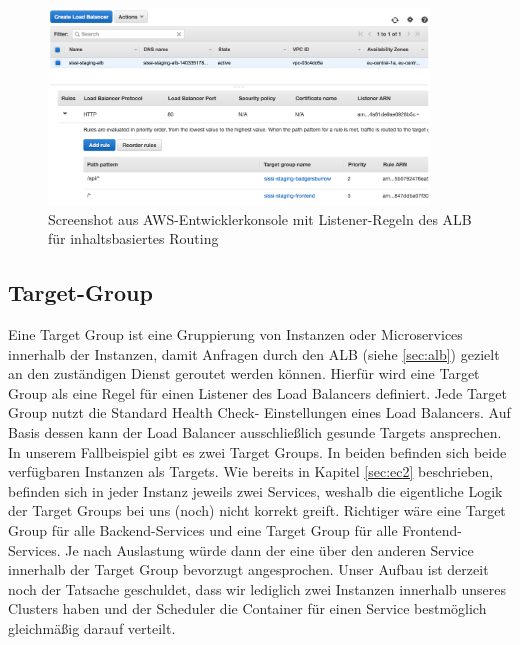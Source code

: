 \begin{figure}[!ht]
  \centering
  \includegraphics[width=0.9\textwidth]{images/routing.png}
  \caption{Screenshot aus AWS-Entwicklerkonsole mit Listener-Regeln des ALB für inhaltsbasiertes Routing}
\end{figure}

\subsection{Target-Group}
\label{sec:target-group}
Eine Target Group ist eine Gruppierung von Instanzen oder Microservices innerhalb der Instanzen, damit Anfragen durch den ALB (siehe \ref{sec:alb}) gezielt an den zuständigen Dienst geroutet werden können. Hierfür wird eine Target Group als eine Regel für einen Listener des Load Balancers definiert. Jede Target Group nutzt die Standard Health Check- Einstellungen eines Load Balancers. Auf Basis dessen kann der Load Balancer ausschließlich gesunde Targets ansprechen. \cite{aws:target} \\

In unserem Fallbeispiel gibt es zwei Target Groups. In beiden befinden sich beide verfügbaren Instanzen als Targets. Wie bereits in Kapitel \ref{sec:ec2} beschrieben, befinden sich in jeder Instanz jeweils zwei Services, weshalb die eigentliche Logik der Target Groups bei uns (noch) nicht korrekt greift. Richtiger wäre eine Target Group für alle Backend-Services und eine Target Group für alle Frontend-Services. Je nach Auslastung würde dann der eine über den anderen Service innerhalb der Target Group bevorzugt angesprochen. Unser Aufbau ist derzeit noch der Tatsache geschuldet, dass wir lediglich zwei Instanzen innerhalb unseres Clusters haben und der Scheduler die Container für einen Service bestmöglich gleichmäßig darauf verteilt.


